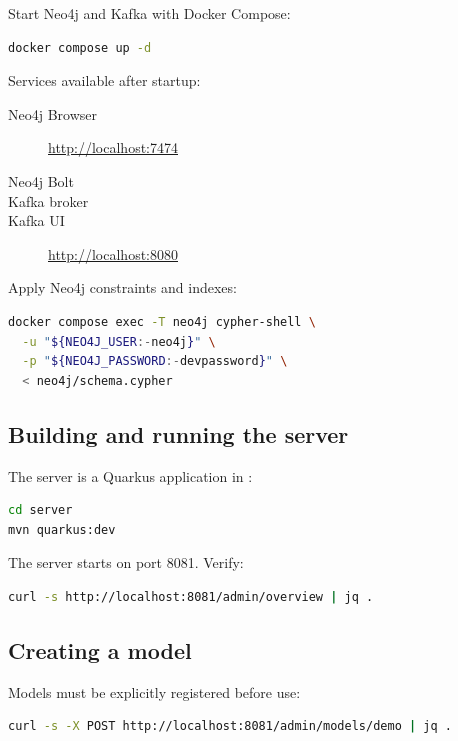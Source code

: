 Start Neo4j and Kafka with Docker Compose:

\begin{lstlisting}[language=bash,caption={Start containers}]
docker compose up -d
\end{lstlisting}

Services available after startup:

\begin{description}
\item[Neo4j Browser] \url{http://localhost:7474}
\item[Neo4j Bolt] 
\item[Kafka broker] 
\item[Kafka UI] \url{http://localhost:8080}
\end{description}

Apply Neo4j constraints and indexes:

\begin{lstlisting}[language=bash,caption={Apply schema}]
docker compose exec -T neo4j cypher-shell \
  -u "${NEO4J_USER:-neo4j}" \
  -p "${NEO4J_PASSWORD:-devpassword}" \
  < neo4j/schema.cypher
\end{lstlisting}

\subsection{Building and running the server}

The server is a Quarkus application in :

\begin{lstlisting}[language=bash,caption={Build and run server}]
cd server
mvn quarkus:dev
\end{lstlisting}

The server starts on port 8081. Verify:

\begin{lstlisting}[language=bash,caption={Health check}]
curl -s http://localhost:8081/admin/overview | jq .
\end{lstlisting}

\subsection{Creating a model}

Models must be explicitly registered before use:

\begin{lstlisting}[language=bash,caption={Register model}]
curl -s -X POST http://localhost:8081/admin/models/demo | jq .
\end{lstlisting}

